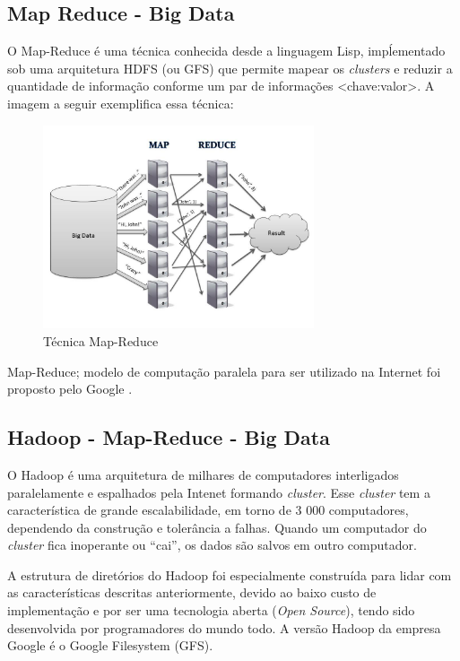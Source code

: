 \subsection{Map Reduce - Big Data}\label{arte:palavraChave:MapReduceBigData}


O Map-Reduce é uma técnica conhecida desde a linguagem Lisp, impĺementado sob uma arquitetura HDFS (ou GFS) que permite mapear os \textit{clusters} e reduzir a quantidade de
 informação conforme um par de informações <chave:valor>.
A imagem a seguir exemplifica essa técnica:

\begin{figure}[ht]
\centering
\caption{Técnica Map-Reduce}
\includegraphics[width=80mm, height=60mm]{Figuras/BigData/MapReduce.jpg}
\end{figure}

Map-Reduce; modelo de computação paralela para ser utilizado na Internet foi proposto pelo Google \cite{Dean2008}.


\subsection{Hadoop - Map-Reduce - Big Data}\label{arte:palavraChave:HadoopMapReduce}

O Hadoop é uma arquitetura de milhares de computadores interligados paralelamente e espalhados pela Intenet formando \textit{cluster}.
Esse \textit{cluster} tem a característica de grande escalabilidade, em torno de 3 000 computadores, dependendo da construção e tolerância a falhas. 
Quando um computador do \textit{cluster} fica inoperante ou ``cai'', os dados são salvos em outro computador. 

A estrutura de diretórios do Hadoop foi especialmente construída para lidar com as características descritas anteriormente, devido ao baixo custo de implementação e 
por ser uma tecnologia aberta (\textit{Open Source}), tendo sido desenvolvida por programadores do mundo todo. A versão Hadoop da empresa Google é o Google Filesystem (GFS).


